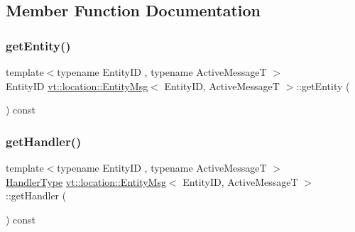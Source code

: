 \subsection{Member Function Documentation}
\mbox{\label{structvt_1_1location_1_1_entity_msg_af288322a731d03cea544bc2e60bb10bd}} 
\subsubsection{\texorpdfstring{get\+Entity()}{getEntity()}}
{\footnotesize\ttfamily template$<$typename Entity\+ID , typename Active\+MessageT $>$ \\
Entity\+ID \hyperlink{structvt_1_1location_1_1_entity_msg}{vt\+::location\+::\+Entity\+Msg}$<$ Entity\+ID, Active\+MessageT $>$\+::get\+Entity (\begin{DoxyParamCaption}{ }\end{DoxyParamCaption}) const\hspace{0.3cm}{\ttfamily [inline]}}

\mbox{\label{structvt_1_1location_1_1_entity_msg_ab373f1520ac7374900bbea1026372b8e}} 
\subsubsection{\texorpdfstring{get\+Handler()}{getHandler()}}
{\footnotesize\ttfamily template$<$typename Entity\+ID , typename Active\+MessageT $>$ \\
\hyperlink{namespacevt_af64846b57dfcaf104da3ef6967917573}{Handler\+Type} \hyperlink{structvt_1_1location_1_1_entity_msg}{vt\+::location\+::\+Entity\+Msg}$<$ Entity\+ID, Active\+MessageT $>$\+::get\+Handler (\begin{DoxyParamCaption}{ }\end{DoxyParamCaption}) const\hspace{0.3cm}{\ttfamily [inline]}}

\mbox{\label{structvt_1_1location_1_1_entity_msg_a5f0675e4fca11168fee86e8af122e289}} 
